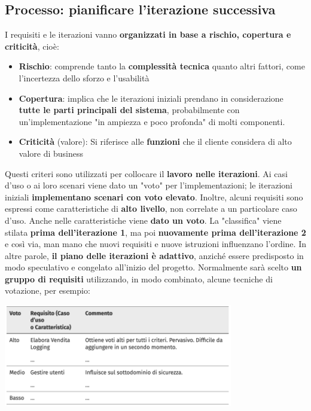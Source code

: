 \documentclass[12pt]{article}
\newcommand{\tb}{\textbf}
\begin{document}
\subsection{Processo: pianificare l'iterazione successiva}
I requisiti e le iterazioni vanno \textbf{organizzati in base a rischio, copertura e criticità}, cioè:
\begin{itemize}
    \item \textbf{Rischio}: comprende tanto la \textbf{complessità tecnica} quanto altri fattori, come l'incertezza dello sforzo e l'usabilità
    \item \textbf{Copertura}: implica che le iterazioni iniziali prendano in considerazione \textbf{tutte le parti principali del sistema}, probabilmente con un'implementazione "in ampiezza e poco profonda" di molti componenti.
    \item \textbf{Criticità} (valore): Si riferisce alle \textbf{funzioni} che il cliente considera di alto valore di business
\end{itemize}
Questi criteri sono utilizzati per collocare il \tb{lavoro nelle iterazioni}. Ai casi d'uso o ai loro scenari viene dato un "voto" per l'implementazioni;
le iterazioni iniziali \tb{implementano scenari con voto elevato}. Inoltre, alcuni requisiti sono espressi come caratteristiche di \tb{alto livello}, non correlate a un particolare caso d'uso.
Anche nelle caratteristiche viene \tb{dato un voto}. La "classifica" viene stilata \tb{prima dell'iterazione 1}, ma poi \tb{nuovamente prima dell'iterazione 2} e così via, man mano che nuovi requisiti e nuove istruzioni influenzano l'ordine.
In altre parole, \tb{il piano delle iterazioni è adattivo}, anziché essere predisposto in modo speculativo e congelato all'inizio del progetto.
Normalmente sarà scelto \tb{un gruppo di requisiti} utilizzando, in modo combinato, alcune tecniche di votazione, per esempio:
\begin{center}
    \includegraphics[width = 0.75\textwidth]{Images/47.png}
\end{center}
\end{document}
